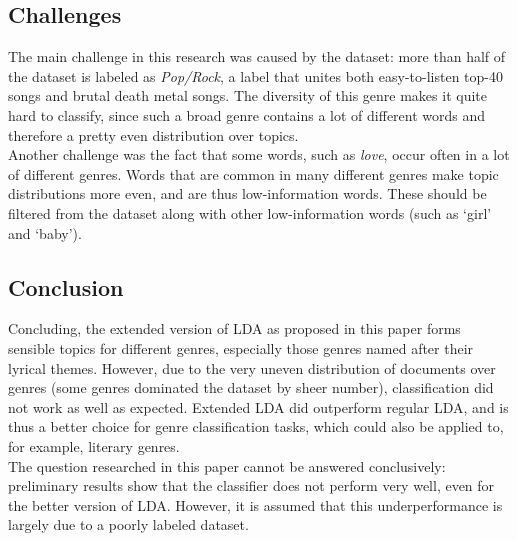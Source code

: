 \subsection{Challenges}
The main challenge in this research was caused by the dataset: more than half of the dataset is labeled as \textit{Pop/Rock}, a label that unites both easy-to-listen top-40 songs and brutal death metal songs. The diversity of this genre makes it quite hard to classify, since such a broad genre contains a lot of different words and therefore a pretty even distribution over topics. \\
Another challenge was the fact that some words, such as \textit{love}, occur often in a lot of different genres. Words that are common in many different genres make topic distributions more even, and are thus low-information words. These should be filtered from the dataset along with other low-information words (such as `girl' and `baby').

\subsection{Conclusion}
Concluding, the extended version of LDA as proposed in this paper forms sensible topics for different genres, especially those genres named after their lyrical themes. However, due to the very uneven distribution of documents over genres (some genres dominated the dataset by sheer number), classification did not work as well as expected. Extended LDA did outperform regular LDA, and is thus a better choice for genre classification tasks, which could also be applied to, for example, literary genres.\\
The question researched in this paper cannot be answered conclusively: preliminary results show that the classifier does not perform very well, even for the better version of LDA. However, it is assumed that this underperformance is largely due to a poorly labeled dataset. 


